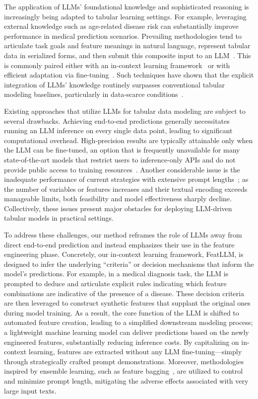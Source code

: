 The application of LLMs’ foundational knowledge and sophisticated reasoning is increasingly being adapted to tabular learning settings. For example, leveraging external knowledge such as age-related disease risk can substantially improve performance in medical prediction scenarios. Prevailing methodologies tend to articulate task goals and feature meanings in natural language, represent tabular data in serialized forms, and then submit this composite input to an LLM~\cite{dinh2022lift,wang2023anypredict}. This is commonly paired either with an in-context learning framework~\cite{nam2023semi} or with efficient adaptation via fine-tuning~\cite{dinh2022lift,hegselmann2023tabllm}. Such techniques have shown that the explicit integration of LLMs’ knowledge routinely surpasses conventional tabular modeling baselines, particularly in data-scarce conditions~\cite{hegselmann2023tabllm}.

Existing approaches that utilize LLMs for tabular data modeling are subject to several drawbacks. Achieving end-to-end predictions generally necessitates running an LLM inference on every single data point, leading to significant computational overhead. High-precision results are typically attainable only when the LLM can be fine-tuned, an option that is frequently unavailable for many state-of-the-art models that restrict users to inference-only APIs and do not provide public access to training resources~\cite{anil2023palm,openai2023gpt4}. Another considerable issue is the inadequate performance of current strategies with extensive prompt lengths~\cite{liu2023lost}; as the number of variables or features increases and their textual encoding exceeds manageable limits, both feasibility and model effectiveness sharply decline. Collectively, these issues present major obstacles for deploying LLM-driven tabular models in practical settings.

To address these challenges, our method reframes the role of LLMs away from direct end-to-end prediction and instead emphasizes their use in the feature engineering phase. Concretely, our in-context learning framework, \textsf{FeatLLM}, is designed to infer the underlying ``criteria'' or decision mechanisms that inform the model’s predictions. For example, in a medical diagnosis task, the LLM is prompted to deduce and articulate explicit rules indicating which feature combinations are indicative of the presence of a disease. These decision criteria are then leveraged to construct synthetic features that supplant the original ones during model training. As a result, the core function of the LLM is shifted to automated feature creation, leading to a simplified downstream modeling process; a lightweight machine learning model can deliver predictions based on the newly engineered features, substantially reducing inference costs. By capitalizing on in-context learning, features are extracted without any LLM fine-tuning—simply through strategically crafted prompt demonstrations. Moreover, methodologies inspired by ensemble learning, such as feature bagging~\cite{breiman2001random}, are utilized to control and minimize prompt length, mitigating the adverse effects associated with very large input texts.

